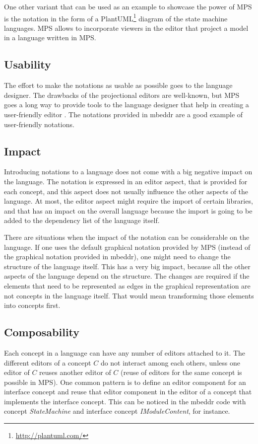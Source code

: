 \documentclass[preprint,numbers,10pt]{sigplanconf}
\begin{document}
One other variant that can be used as an example to showcase the power of MPS
is the notation in the form of a PlantUML\footnote{\url{http://plantuml.com/}} diagram of the
state machine languages. MPS allows to incorporate viewers in the editor that project a model in a language
written in MPS.

\subsection{Usability}
The effort to make the notations as usable as possible goes to the language designer. The drawbacks of the
projectional editors are well-known, but MPS goes a long way to provide tools to the language
designer that help in creating a user-friendly editor \cite{voelter2014towards}.
The notations provided in mbeddr are a good example of user-friendly notations.

\subsection{Impact}
Introducing notations to a language does not come with a big negative impact on the language.
The notation is expressed in an editor aspect, that is provided for each concept, and this aspect
does not usually influence the other aspects of the language.
At most, the editor aspect might require the import of certain libraries, and that has an impact on the overall
language because the import is going to be added to the dependency list of the language itself.

There are situations when the impact of the notation can be considerable on the language. If one uses the default
graphical notation provided by MPS (instead of the graphical notation provided in mbeddr), one might need to
change the structure of the language itself. This has a very big impact, because all the other aspects of the language
depend on the structure. The changes are required if the elements that need to be represented as edges in the graphical representation
are not concepts in the language itself. That would mean transforming those elements into concepts first.

\subsection{Composability}
Each concept in a language can have any number of editors attached to it. The different editors of a concept $C$
do not interact among each others, unless one editor of $C$ reuses another editor of $C$ (reuse of editors for the same concept
is possible in MPS). One common pattern is to define an editor component for an interface concept and reuse that
editor component in the editor of a concept that implements the interface concept. This can be noticed in the
mbeddr code with concept \emph{StateMachine} and interface concept \emph{IModuleContent}, for instance.
\end{document}
